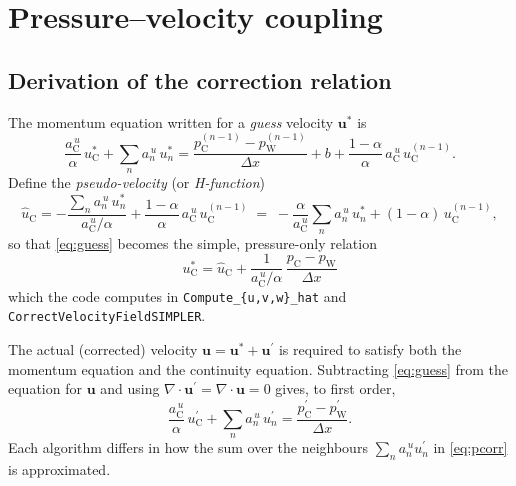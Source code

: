 \documentclass[11pt,a4paper]{article}
\newcommand{\vc}[1]{\mathbf{#1}}            %
\newcommand{\cw}{\mathrm{W}}
\newcommand{\cc}{\mathrm{C}}
\begin{document}
\section{Pressure--velocity coupling}
\label{sec:coupling}

\subsection{Derivation of the correction relation}

The momentum equation written for a \emph{guess} velocity $\vc{u}^{*}$ is
\begin{equation}
\frac{a^{\,u}_{\cc}}{\alpha}\,u^{*}_{\cc}
+\sum_{n}a^{\,u}_{n}\,u^{*}_{n}
=\frac{p^{(n-1)}_{\cc}-p^{(n-1)}_{\cw}}{\Delta x}
+b+\frac{1-\alpha}{\alpha}\,a^{\,u}_{\cc}\,u^{(n-1)}_{\cc} .
\label{eq:guess}
\end{equation}
Define the \emph{pseudo-velocity} (or \emph{H-function})
\begin{equation}
\widehat{u}_{\cc}
=-\frac{\sum_{n}a^{\,u}_{n}\,u^{*}_{n}}{a^{\,u}_{\cc}/\alpha}
+\frac{1-\alpha}{\alpha}\,a^{\,u}_{\cc}\,u^{(n-1)}_{\cc}
\;=\;
-\frac{\alpha}{a^{\,u}_{\cc}}\sum_{n}a^{\,u}_{n}\,u^{*}_{n}
+(1-\alpha)\,u^{(n-1)}_{\cc} ,
\label{eq:uhat}
\end{equation}
so that \eqref{eq:guess} becomes the simple, pressure-only relation
\begin{equation}
\boxed{\;
u^{*}_{\cc}=\widehat{u}_{\cc}
+\frac{1}{a^{\,u}_{\cc}/\alpha}\,
\frac{p_{\cc}-p_{\cw}}{\Delta x}
\;}
\label{eq:urel}
\end{equation}
which the code computes in \texttt{Compute\_\{u,v,w\}\_hat} and
\texttt{CorrectVelocityField\allowbreak SIMPLER}.

The actual (corrected) velocity $\vc{u}=\vc{u}^{*}+\vc{u}^{\prime}$ is
required to satisfy both the momentum equation and the continuity equation.
Subtracting \eqref{eq:guess} from the equation for $\vc{u}$ and using
$\nabla\!\cdot\!\vc{u}^{\prime}=\nabla\!\cdot\!\vc{u}=0$ gives, to first
order,
\begin{equation}
\frac{a^{\,u}_{\cc}}{\alpha}\,u^{\prime}_{\cc}
+\sum_{n}a^{\,u}_{n}\,u^{\prime}_{n}
=\frac{p^{\prime}_{\cc}-p^{\prime}_{\cw}}{\Delta x} .
\label{eq:pcorr}
\end{equation}
Each algorithm differs in how the sum over the neighbours
$\sum_{n}a^{\,u}_{n}u^{\prime}_{n}$ in \eqref{eq:pcorr} is approximated.
\end{document}
